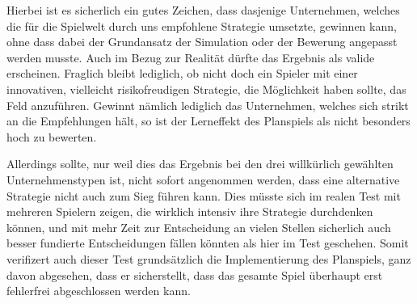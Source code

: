 Hierbei ist es sicherlich ein gutes Zeichen, dass dasjenige Unternehmen, welches die für die Spielwelt durch uns empfohlene Strategie umsetzte, gewinnen kann, ohne dass dabei der Grundansatz der Simulation oder der Bewerung angepasst werden musste. Auch im Bezug zur Realität dürfte das Ergebnis als valide erscheinen. Fraglich bleibt lediglich, ob nicht doch ein Spieler mit einer innovativen, vielleicht risikofreudigen Strategie, die Möglichkeit haben sollte, das Feld anzuführen. Gewinnt nämlich lediglich das Unternehmen, welches sich strikt an die Empfehlungen hält, so ist der Lerneffekt des Planspiels als nicht besonders hoch zu bewerten.

Allerdings sollte, nur weil dies das Ergebnis bei den drei willkürlich gewählten Unternehmenstypen ist, nicht sofort angenommen werden, dass eine alternative Strategie nicht auch zum Sieg führen kann. Dies müsste sich im realen Test mit mehreren Spielern zeigen, die wirklich intensiv ihre Strategie durchdenken können, und mit mehr Zeit zur Entscheidung an vielen Stellen sicherlich auch besser fundierte Entscheidungen fällen könnten als hier im Test geschehen. Somit verifizert auch dieser Test grundsätzlich die Implementierung des Planspiels, ganz davon abgesehen, dass er sicherstellt, dass das gesamte Spiel überhaupt erst fehlerfrei abgeschlossen werden kann.

\autorende{}